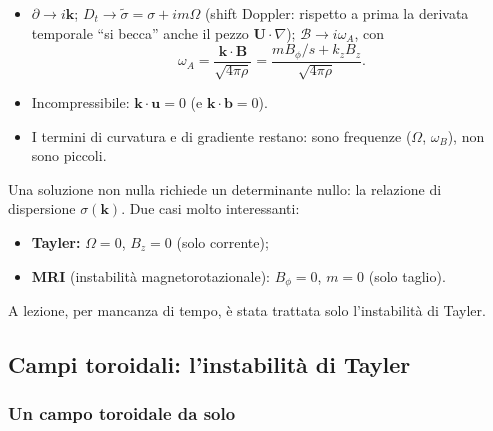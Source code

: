 \begin{itemize}
\item $\partial\to i\mathbf{k}$; $D_t\to\tilde\sigma=\sigma+im\Omega$ (shift Doppler: rispetto a prima la derivata temporale ``si becca'' anche il pezzo $\mathbf{U}\cdot\nabla$); $\mathcal{B}\to i\omega_A$, con
\begin{equation}
\omega_A=\frac{\mathbf{k}\cdot\mathbf{B}}{\sqrt{4\pi\rho}}=\frac{mB_\phi/s+k_zB_z}{\sqrt{4\pi\rho}}.
\end{equation}
\item Incompressibile: $\mathbf{k}\cdot\mathbf{u}=0$ (e $\mathbf{k}\cdot\mathbf{b}=0$).
\item I termini di curvatura e di gradiente restano: sono frequenze ($\Omega$, $\omega_B$), non sono piccoli.
\end{itemize}
Una soluzione non nulla richiede un determinante nullo: la relazione di dispersione $\sigma(\mathbf{k})$. Due casi molto interessanti:
\begin{itemize}
\item \textbf{Tayler:} $\Omega=0$, $B_z=0$ (solo corrente);
\item \textbf{MRI} (instabilità magnetorotazionale): $B_\phi=0$, $m=0$ (solo taglio).
\end{itemize}
A lezione, per mancanza di tempo, è stata trattata solo l'instabilità di Tayler.

\subsection{Campi toroidali: l'instabilità di Tayler}

\subsubsection{Un campo toroidale da solo}

